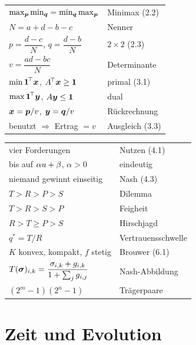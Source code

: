 \begin{merksatz}
\begin{center}
{\small
\renewcommand{\arraystretch}{1.62}
\begin{tabular}{@{}P{4.4cm}P{4.2cm}@{}}
\toprule
$\max_{\boldsymbol{p}}\min_{\boldsymbol{q}} = \min_{\boldsymbol{q}}\max_{\boldsymbol{p}}$ & Minimax (2.2)\\
$N = a+d-b-c$ & Nenner\\
$p = \dfrac{d-c}{N}$, $q = \dfrac{d-b}{N}$ & $2\times2$ (2.3)\\
$v = \dfrac{ad-bc}{N}$ & Determinante\\
$\min \boldsymbol{1}^{\!\top}\boldsymbol{x}$, $A^{\!\top}\boldsymbol{x} \ge \boldsymbol{1}$ & primal (3.1)\\
$\max \boldsymbol{1}^{\!\top}\boldsymbol{y}$, $A\boldsymbol{y} \le \boldsymbol{1}$ & dual\\
$\boldsymbol{x} = \boldsymbol{p}/v$, $\boldsymbol{y} = \boldsymbol{q}/v$ & Rückrechnung\\
benutzt $\Rightarrow$ Ertrag $=v$ & Ausgleich (3.3)\\
\bottomrule
\end{tabular}}
\end{center}
\end{merksatz}

\begin{merksatz}
\begin{center}
{\small
\renewcommand{\arraystretch}{1.62}
\begin{tabular}{@{}P{4.4cm}P{4.2cm}@{}}
\toprule
vier Forderungen & Nutzen (4.1)\\
bis auf $\alpha u+\beta$, $\alpha>0$ & eindeutig\\
niemand gewinnt einseitig & Nash (4.3)\\
$T>R>P>S$ & Dilemma\\
$T>R>S>P$ & Feigheit\\
$R>T\ge P>S$ & Hirschjagd\\
$q^{*} = T/R$ & Vertrauensschwelle\\
$K$ konvex, kompakt, $f$ stetig & Brouwer (6.1)\\
$T(\boldsymbol{\sigma})_{i,k} = \dfrac{\sigma_{i,k}+g_{i,k}}{1+\sum_j g_{i,j}}$ & Nash-Abbildung\\
$(2^{m}-1)(2^{n}-1)$ & Trägerpaare\\
\bottomrule
\end{tabular}}
\end{center}
\end{merksatz}

\section{Zeit und Evolution}

